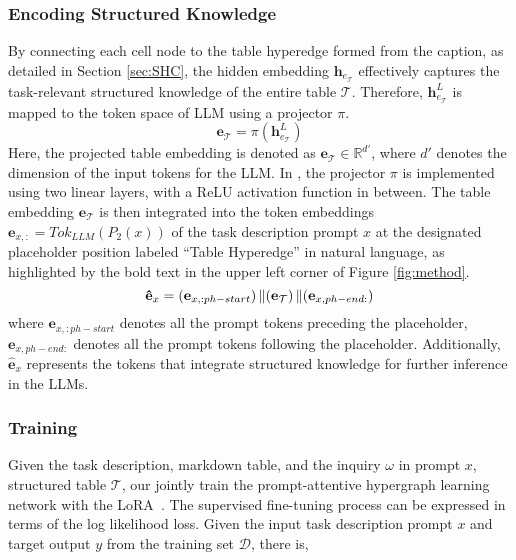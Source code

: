 {\subsubsection{Encoding Structured Knowledge} By connecting each cell node to the table hyperedge formed from the caption, as detailed in Section \ref{sec:SHC}, the hidden embedding $\mathbf{h}_{e_{\mathcal{T}}}$ effectively captures the task-relevant structured knowledge of the entire table $\mathcal{T}$. Therefore, $\mathbf{h}_{e_{\mathcal{T}}}^{L}$ is mapped to the token space of LLM using a projector $\pi$.
\begin{equation}
\mathbf{e}_{\mathcal{T}}=\pi(\mathbf{h}_{e_{\mathcal{T}}}^{L})
\end{equation}
Here, the projected table embedding is denoted as $\mathbf{e}_{\mathcal{T}}\in\mathbb{R}^{d'}$, where $d'$ denotes the dimension of the input tokens for the LLM. In \name, the projector $\pi$ is implemented using two linear layers, with a ReLU activation function in between. The table embedding $\mathbf{e}_{\mathcal{T}}$ is then integrated into the token embeddings $\mathbf{e}_{x,:}=Tok_{LLM}(P_2(x))$ of the task description prompt $x$ at the designated placeholder position labeled ``Table Hyperedge'' in natural language, as highlighted by the bold text in the upper left corner of Figure \ref{fig:method}. 
\begin{equation}
 \mathbf{\hat{e}}_{x}=(\mathbf{e}_{x,:ph-start})\operatorname*{\Vert}(\mathbf{e}_{\mathcal{T}})\operatorname*{\Vert}(\mathbf{e}_{x,ph-end:})
\end{equation}
where $\mathbf{e}_{x,:ph-start}$ denotes all the prompt tokens preceding the placeholder, $\mathbf{e}_{x,ph-end:}$ denotes all the prompt tokens following the placeholder. Additionally,  $\mathbf{\hat{e}}_{x}$ represents the tokens that integrate structured knowledge for further inference in the LLMs.

\subsubsection{Training}
Given the task description, markdown table, and the inquiry $\omega$ in prompt $x$, structured table $\mathcal{T}$, our \name jointly train the prompt-attentive hypergraph learning network with the LoRA~\cite{hu2022lora}. The supervised fine-tuning process can be expressed in terms of the log likelihood loss. Given the input task description prompt $x$ and target output $y$ from the training set $\mathcal{D}$, there is,

}
